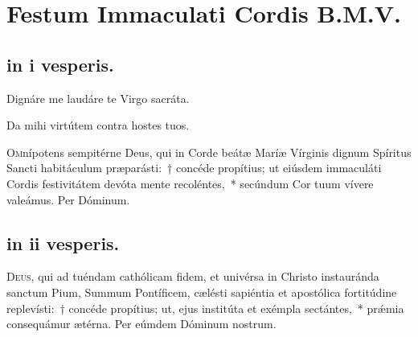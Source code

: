 \documentclass[vesperale_romanum.tex]{subfiles}
\begin{document}

\section{Festum Immaculati Cordis B.M.V.}
 

\subsection{in i vesperis.}

\vv Dignáre me laudáre te Virgo sacráta. %

\rr Da mihi virtútem contra hostes tuos.


\lettrine{O}{m}nípotens sempitérne Deus, qui in Corde beátæ Maríæ Vírginis dignum Spíritus Sancti habitáculum præparásti:~† concéde propítius; ut eiúsdem immaculáti Cordis festivitátem devóta mente recoléntes,~* secúndum Cor tuum vívere valeámus. Per Dóminum.


\subsection{in ii vesperis.}





\lettrine{D}{eus}, qui ad tuéndam cathólicam fidem, et univérsa in Christo instauránda sanctum Pium, Summum Pontíficem, cælésti sapiéntia et apostólica fortitúdine replevísti:~† concéde propítius; ut, ejus institúta et exémpla sectántes,~* prǽmia consequámur ætérna.
Per eúmdem Dóminum nostrum.
\end{document}

